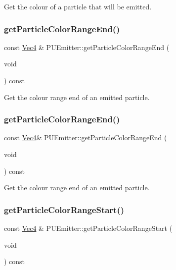 Get the colour of a particle that will be emitted. \mbox{\label{classPUEmitter_ac971bd9710f188afe3da5ac821d337ae}} 
\subsubsection{\texorpdfstring{get\+Particle\+Color\+Range\+End()}{getParticleColorRangeEnd()}\hspace{0.1cm}{\footnotesize\ttfamily [1/2]}}
{\footnotesize\ttfamily const \hyperlink{classVec4}{Vec4} \& P\+U\+Emitter\+::get\+Particle\+Color\+Range\+End (\begin{DoxyParamCaption}\item[{void}]{ }\end{DoxyParamCaption}) const}

Get the colour range end of an emitted particle. \mbox{\label{classPUEmitter_ad2280697609011dde8484dbbeda4efe4}} 
\subsubsection{\texorpdfstring{get\+Particle\+Color\+Range\+End()}{getParticleColorRangeEnd()}\hspace{0.1cm}{\footnotesize\ttfamily [2/2]}}
{\footnotesize\ttfamily const \hyperlink{classVec4}{Vec4}\& P\+U\+Emitter\+::get\+Particle\+Color\+Range\+End (\begin{DoxyParamCaption}\item[{void}]{ }\end{DoxyParamCaption}) const}

Get the colour range end of an emitted particle. \mbox{\label{classPUEmitter_aeee3ac1b853918d874898247722f061c}} 
\subsubsection{\texorpdfstring{get\+Particle\+Color\+Range\+Start()}{getParticleColorRangeStart()}\hspace{0.1cm}{\footnotesize\ttfamily [1/2]}}
{\footnotesize\ttfamily const \hyperlink{classVec4}{Vec4} \& P\+U\+Emitter\+::get\+Particle\+Color\+Range\+Start (\begin{DoxyParamCaption}\item[{void}]{ }\end{DoxyParamCaption}) const}

